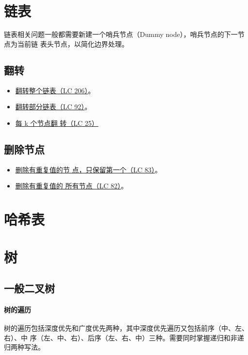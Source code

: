 \section{链表}
链表相关问题一般都需要新建一个哨兵节点（Dummy node），哨兵节点的下一节点为当前链
表头节点，以简化边界处理。

\subsection{翻转}
\begin{itemize}
  \item
    \href{https://leetcode.com/problems/reverse-linked-list}{翻转整个链表（LC
    206）}。
  \item
    \href{https://leetcode.com/problems/reverse-linked-list-ii}{翻转部分链表（LC
    92）}。
  \item
    \href{https://leetcode.com/problems/reverse-nodes-in-k-group/}{每 k 个节点翻
      转（LC 25）}
\end{itemize}

\subsection{删除节点}
\begin{itemize}
  \item
    \href{https://leetcode.com/problems/reverse-linked-list}{删除有重复值的节
      点，只保留第一个（LC 83）}。
  \item
    \href{https://leetcode.com/problems/reverse-linked-list-ii}{删除有重复值的
      所有节点（LC 82）}。
\end{itemize}


\section{哈希表}

\section{树}

\subsection{一般二叉树}
\paragraph{树的遍历}
树的遍历包括深度优先和广度优先两种，其中深度优先遍历又包括前序（中、左、右）、中
序（左、中、右）、后序（左、右、中）三种。需要同时掌握递归和非递归两种写法。

